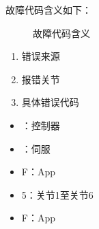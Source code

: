 \documentclass[a4paper,11pt,english,openany,oneside]{sphinxmanual}
\begin{document}
\sphinxAtStartPar
故障代码含义如下：

\begin{figure}[H]
\centering
\capstart

\noindent{}
\caption{故障代码含义}\label{\detokenize{_u6545_u969c_u6392_u67e5:id7}}\end{figure}
\begin{enumerate}
%
\item {} 
\sphinxAtStartPar
错误来源

\item {} 
\sphinxAtStartPar
报错关节

\item {} 
\sphinxAtStartPar
具体错误代码

\end{enumerate}

\sphinxAtStartPar
{}
\begin{itemize}
\item {} 
：控制器

\item {} 
：伺服

\item {} 
\sphinxAtStartPar
F：App

\end{itemize}

\sphinxAtStartPar
{}
\begin{itemize}
\item {} 
\sphinxhyphen{}5：关节1至关节6

\item {} 
\sphinxAtStartPar
F：App

\end{itemize}



\renewcommand{\indexname}{索引}
\printindex
\end{document}

